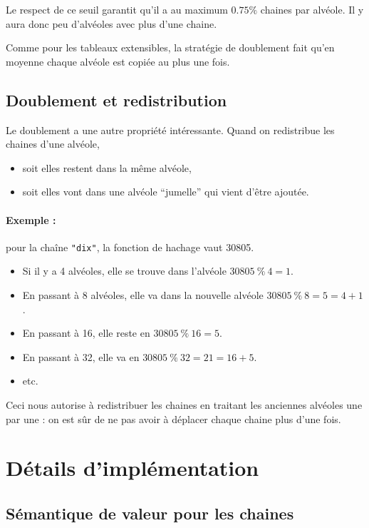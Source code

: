 Le respect de ce seuil
garantit qu'il a au maximum $0.75\%$ chaines par alvéole. Il y aura
donc peu d'alvéoles avec plus d'une chaine.


Comme pour les tableaux extensibles, la stratégie de doublement fait
qu'en moyenne chaque alvéole est copiée au plus une fois.

\subsection{Doublement et redistribution}

Le doublement a une autre propriété intéressante.
Quand on redistribue
les chaines d'une alvéole,
\begin{itemize}
\item soit elles restent dans la même alvéole,
\item soit elles vont dans une alvéole ``jumelle'' qui vient d'être ajoutée.
\end{itemize}

\paragraph{Exemple :} pour la chaîne \texttt{"dix"}, la fonction de hachage
vaut 30805.
\begin{itemize}
\item Si il y a 4 alvéoles, elle se trouve dans l'alvéole
  $30805 \ \%\  4 = 1$.
  \item En passant à 8 alvéoles, elle va dans la nouvelle
    alvéole $30805 \ \%\  8 = 5 = 4 + 1$.
    \item En passant à 16, elle reste en
      $30805 \ \%\  16 = 5$.
      \item En passant à 32, elle va
en $30805 \ \%\  32 = 21 =
16 + 5$.
\item etc.
  
\end{itemize}
Ceci nous autorise à redistribuer les chaines en traitant les
anciennes alvéoles une par une : on est sûr de ne pas avoir à déplacer
chaque chaine plus d'une fois.


\section{Détails d'implémentation}

\subsection{Sémantique de valeur pour les chaines}

